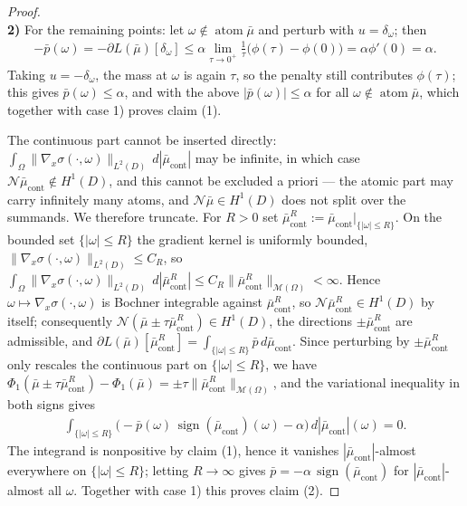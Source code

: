 \documentclass[11pt]{amsart}
\theoremstyle{definition}
\theoremstyle{remark}
\DeclareMathOperator{\atom}{atom}
\DeclareMathOperator{\cont}{cont}
\DeclareMathOperator{\sign}{sign}
\begin{document}
\begin{proof}
\quad\\
\textbf{2)} For the remaining points: let $\omega \notin \atom \bar{\mu}$ and perturb with $ u = \delta_\omega$; then
\begin{align*}
	-\bar{p}(\omega) =  - \partial L(\bar{\mu})[\delta_\omega] \le \alpha \lim_{\tau \rightarrow 0^+ } \frac{1}{\tau} \big( \phi(\tau) - \phi(0) \big) = \alpha \phi'(0) = \alpha.
\end{align*}
Taking $u = - \delta_\omega$, the mass at $\omega$ is again $\tau$, so the penalty still contributes $\phi(\tau)$; this gives $\bar{p}(\omega) \le \alpha$, and with the above $|\bar{p}(\omega)| \le \alpha$ for all $\omega \notin \atom \bar{\mu}$, which together with case 1) proves claim (1).\par
The continuous part cannot be inserted directly: $\int_\Omega \|\nabla_x \sigma(\cdot, \omega)\|_{L^2(D)} \, d|\bar{\mu}_{\cont}|$ may be infinite, in which case $\mathcal{N}\bar{\mu}_{\cont} \notin H^1(D)$, and this cannot be excluded a priori --- the atomic part may carry infinitely many atoms, and $\mathcal{N}\bar{\mu} \in H^1(D)$ does not split over the summands. We therefore truncate. For $R > 0$ set $\bar{\mu}_{\cont}^R := \bar{\mu}_{\cont}|_{\{|\omega| \le R\}}$. On the bounded set $\{|\omega| \le R\}$ the gradient kernel is uniformly bounded, $\|\nabla_x \sigma(\cdot, \omega)\|_{L^2(D)} \le C_R$, so $\int_\Omega \|\nabla_x \sigma(\cdot, \omega)\|_{L^2(D)} \, d|\bar{\mu}_{\cont}^R| \le C_R \|\bar{\mu}_{\cont}^R\|_{\mathcal{M}(\Omega)} < \infty$. Hence $\omega \mapsto \nabla_x \sigma(\cdot, \omega)$ is Bochner integrable against $\bar{\mu}_{\cont}^R$, so $\mathcal{N}\bar{\mu}_{\cont}^R \in H^1(D)$ by itself; consequently $\mathcal{N}(\bar{\mu} \pm \tau \bar{\mu}_{\cont}^R) \in H^1(D)$, the directions $\pm\bar{\mu}_{\cont}^R$ are admissible, and $\partial L(\bar{\mu})[\bar{\mu}_{\cont}^R] = \int_{\{|\omega| \le R\}} \bar{p} \, d\bar{\mu}_{\cont}$. Since perturbing by $\pm \bar{\mu}_{\cont}^R$ only rescales the continuous part on $\{|\omega| \le R\}$, we have $\Phi_1(\bar{\mu} \pm \tau \bar{\mu}_{\cont}^R) - \Phi_1(\bar{\mu}) = \pm \tau \|\bar{\mu}_{\cont}^R\|_{\mathcal{M}(\Omega)}$, and the variational inequality in both signs gives
\begin{align*}
	\int_{\{|\omega| \le R\}} \bigg( - \bar{p}(\omega) \, \sign( \bar{\mu}_{\cont}) (\omega)  - \alpha \bigg) \, d|\bar{\mu}_{\cont}|(\omega) = 0.
\end{align*}
The integrand is nonpositive by claim (1), hence it vanishes $|\bar{\mu}_{\cont}|$-almost everywhere on $\{|\omega| \le R\}$; letting $R \to \infty$ gives $\bar{p} =  - \alpha \, \sign (\bar{\mu}_{\cont})$ for $|\bar{\mu}_{\cont}|$-almost all $\omega$. Together with case 1) this proves claim (2).
\end{proof}
\end{document}
